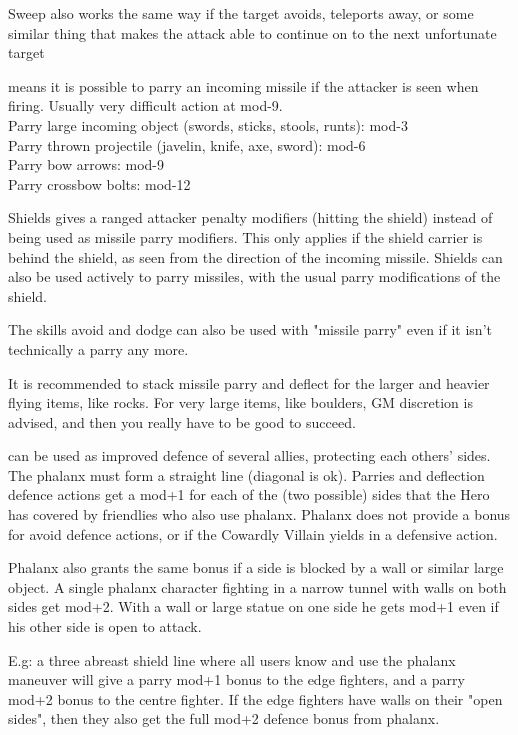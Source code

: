 Sweep also works the same way if the target avoids, teleports away, or some similar thing that makes the attack able to continue on to the next unfortunate target


 means it is possible to parry an incoming missile if the attacker is seen when firing. Usually very difficult action at mod-9. \\
Parry large incoming object (swords, sticks, stools, runts): mod-3 \\
Parry thrown projectile (javelin, knife, axe, sword): mod-6 \\
Parry bow arrows: mod-9 \\
Parry crossbow bolts: mod-12

Shields gives a ranged attacker penalty modifiers (hitting the shield) instead of being used as missile parry modifiers. This only applies if the shield carrier is behind the shield, as seen from the direction of the incoming missile. Shields can also be used actively to parry missiles, with the usual parry modifications of the shield.

The skills avoid and dodge can also be used with "missile parry" even if it isn't technically a parry any more.

It is recommended to stack missile parry and deflect for the larger and heavier flying items, like rocks. For very large items, like boulders, GM discretion is advised, and then you really have to be good to succeed.


 can be used as improved defence of several allies, protecting each others' sides. The phalanx must form a straight line (diagonal is ok).
Parries and deflection defence actions get a mod+1 for each of the (two possible) sides that the Hero has covered by friendlies who also use phalanx. Phalanx does not provide a bonus for avoid defence actions, or if the Cowardly Villain yields in a defensive action.

Phalanx also grants the same bonus if a side is blocked by a wall or similar large object. A single phalanx character fighting in a narrow tunnel with walls on both sides get mod+2. With a wall or large statue on one side he gets mod+1 even if his other side is open to attack.

E.g: a three abreast shield line where all users know and use the phalanx maneuver will give a parry mod+1 bonus to the edge fighters, and a parry mod+2 bonus to the centre fighter. If the edge fighters have walls on their "open sides", then they also get the full mod+2 defence bonus from phalanx.

